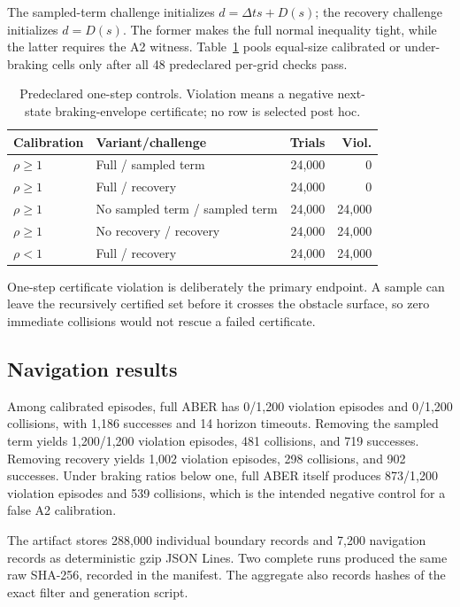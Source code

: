 \documentclass[letterpaper]{article}
\begin{document}
The sampled-term challenge initializes $d=\Delta t s+D(s)$; the recovery
challenge initializes $d=D(s)$.  The former makes the full normal inequality
tight, while the latter requires the A2 witness.  Table~\ref{tab:boundary}
pools equal-size calibrated or under-braking cells only after all 48
predeclared per-grid checks pass.

\begin{table}[t]
\centering
\small
\setlength{\tabcolsep}{3.2pt}
\begin{tabular}{llrr}
\toprule
Calibration & Variant/challenge & Trials & Viol.\\
\midrule
$\rho\ge1$ & Full / sampled term & 24,000 & 0\\
$\rho\ge1$ & Full / recovery & 24,000 & 0\\
$\rho\ge1$ & No sampled term / sampled term & 24,000 & 24,000\\
$\rho\ge1$ & No recovery / recovery & 24,000 & 24,000\\
$\rho<1$ & Full / recovery & 24,000 & 24,000\\
\bottomrule
\end{tabular}
\caption{Predeclared one-step controls.  Violation means a negative
next-state braking-envelope certificate; no row is selected post hoc.}
\label{tab:boundary}
\end{table}

One-step certificate violation is deliberately the primary endpoint.  A
sample can leave the recursively certified set before it crosses the obstacle
surface, so zero immediate collisions would not rescue a failed certificate.

\subsection{Navigation results}

Among calibrated episodes, full ABER has 0/1,200 violation episodes and
0/1,200 collisions, with 1,186 successes and 14 horizon timeouts.  Removing
the sampled term yields 1,200/1,200 violation episodes, 481 collisions, and
719 successes.  Removing recovery yields 1,002 violation episodes, 298
collisions, and 902 successes.  Under braking ratios below one, full ABER
itself produces 873/1,200 violation episodes and 539 collisions, which is the
intended negative control for a false A2 calibration.

The artifact stores 288,000 individual boundary records and 7,200 navigation
records as deterministic gzip JSON Lines.  Two complete runs produced the
same raw SHA-256, recorded in the manifest.  The aggregate also records hashes
of the exact filter and generation script.
\end{document}
